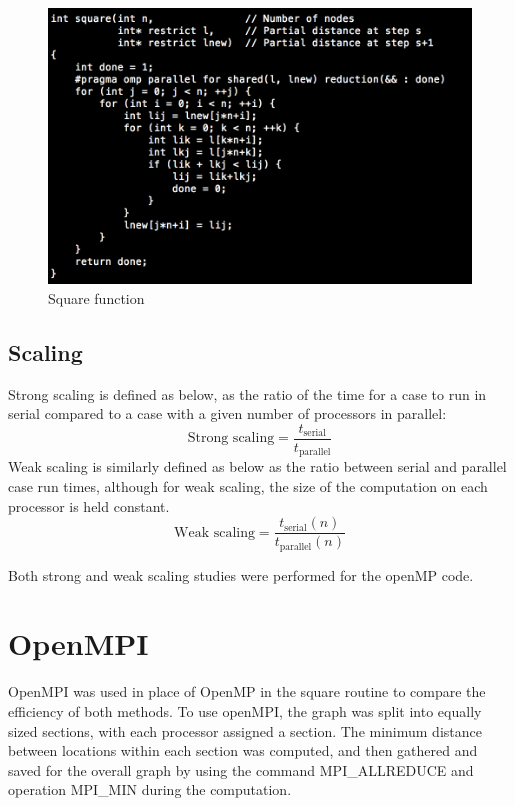 \documentclass{article}
\begin{document}
	\begin{figure}[h!]
		\begin{center}
			\includegraphics[width=0.5\columnwidth]{square}
			\caption{Square function}
			\label{square}
		\end{center}
	\end{figure}
		
\subsection{Scaling}
Strong scaling is defined as below, as the ratio of the time for a case to run in serial compared to a case with a given number of processors in parallel:
\begin{equation}
\textrm{Strong scaling} = \frac{t_{\textrm{serial}}}{t_{\textrm{parallel}}}
\end{equation}
Weak scaling is similarly defined as below as the ratio between serial and parallel case run times, although for weak scaling, the size of the computation on each processor is held constant. \\
\begin{equation}
\textrm{Weak scaling} = \frac{t_{\textrm{serial}}(n)}{t_{\textrm{parallel}}(n)}
\end{equation}

Both strong and weak scaling studies were performed for the openMP code.


\section{OpenMPI}

OpenMPI was used in place of OpenMP in the square routine to compare the efficiency of both methods. To use openMPI, the graph was split into equally sized sections, with each processor assigned a section. The minimum distance between locations within each section was computed, and then gathered and saved for the overall graph by using the command MPI\_ALLREDUCE and operation MPI\_MIN during the computation.  
\end{document}
